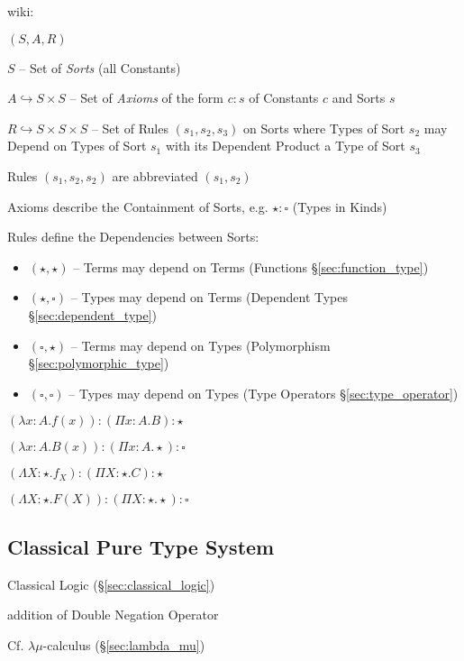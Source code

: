 \asterism


wiki:

$(S,A,R)$

$S$ -- Set of \emph{Sorts} (all Constants)

$A \hookrightarrow S \times S$ -- Set of \emph{Axioms} of the form
$c:s$ of Constants $c$ and Sorts $s$

$R \hookrightarrow S \times S \times S$ -- Set of Rules
$(s_1,s_2,s_3)$ on Sorts where Types of Sort $s_2$ may Depend on Types
of Sort $s_1$ with its Dependent Product a Type of Sort $s_3$

Rules $(s_1,s_2,s_2)$ are abbreviated
$(s_1,s_2)$

Axioms describe the Containment of Sorts, e.g. $\star:\square$ (Types
in Kinds)

Rules define the Dependencies between Sorts:
\begin{itemize}
  \item $(\star,\star)$ -- Terms may depend on Terms (Functions
    \S\ref{sec:function_type})
  \item $(\star,\square)$ -- Types may depend on Terms (Dependent
    Types \S\ref{sec:dependent_type})
  \item $(\square,\star)$ -- Terms may depend on Types (Polymorphism
    \S\ref{sec:polymorphic_type})
  \item $(\square,\square)$ -- Types may depend on Types (Type
    Operators \S\ref{sec:type_operator})
\end{itemize}

$(\lambda x:A.f(x)):(\Pi x:A.B):\star$

$(\lambda x:A.B(x)):(\Pi x:A.\star):\square$

$(\Lambda X:\star.f_X):(\Pi X:\star.C):\star$

$(\Lambda X:\star.F(X)):(\Pi X:\star.\star):\square$



\subsection{Classical Pure Type System}\label{sec:cpts}

Classical Logic (\S\ref{sec:classical_logic})

addition of Double Negation Operator

\fist Cf. $\lambda\mu$-calculus (\S\ref{sec:lambda_mu})




